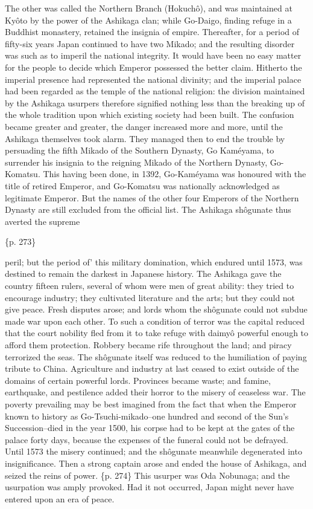 The other was called the Northern Branch (Hokuchô), and was maintained at Kyôto by the power of the Ashikaga clan; while Go-Daigo, finding refuge in a Buddhist monastery, retained the insignia of empire. Thereafter, for a period of fifty-six years Japan continued to have two Mikado; and the resulting disorder was such as to imperil the national integrity. It would have been no easy matter for the people to decide which Emperor possessed the better claim. Hitherto the imperial presence had represented the national divinity; and the imperial palace had been regarded as the temple of the national religion: the division maintained by the Ashikaga usurpers therefore signified nothing less than the breaking up of the whole tradition upon which existing society had been built. The confusion became greater and greater, the danger increased more and more, until the Ashikaga themselves took alarm. They managed then to end the trouble by persuading the fifth Mikado of the Southern Dynasty, Go Kaméyama, to surrender his insignia to the reigning Mikado of the Northern Dynasty, Go-Komatsu. This having been done, in 1392, Go-Kaméyama was honoured with the title of retired Emperor, and Go-Komatsu was nationally acknowledged as legitimate Emperor. But the names of the other four Emperors of the Northern Dynasty are still excluded from the official list. The Ashikaga shôgunate thus averted the supreme

\{p. 273\}

peril; but the period of' this military domination, which endured until 1573, was destined to remain the darkest in Japanese history. The Ashikaga gave the country fifteen rulers, several of whom were men of great ability: they tried to encourage industry; they cultivated literature and the arts; but they could not give peace. Fresh disputes arose; and lords whom the shôgunate could not subdue made war upon each other. To such a condition of terror was the capital reduced that the court nobility fled from it to take refuge with daimyô powerful enough to afford them protection. Robbery became rife throughout the land; and piracy terrorized the seas. The shôgunate itself was reduced to the humiliation of paying tribute to China. Agriculture and industry at last ceased to exist outside of the domains of certain powerful lords. Provinces became waste; and famine, earthquake, and pestilence added their horror to the misery of ceaseless war. The poverty prevailing may be best imagined from the fact that when the Emperor known to history as Go-Tsuchi-mikado--one hundred and second of the Sun's Succession--died in the year 1500, his corpse had to be kept at the gates of the palace forty days, because the expenses of the funeral could not be defrayed. Until 1573 the misery continued; and the shôgunate meanwhile degenerated into insignificance. Then a strong captain arose and ended the house of Ashikaga, and seized the reins of power. \{p. 274\} This usurper was Oda Nobunaga; and the usurpation was amply provoked. Had it not occurred, Japan might never have entered upon an era of peace.

